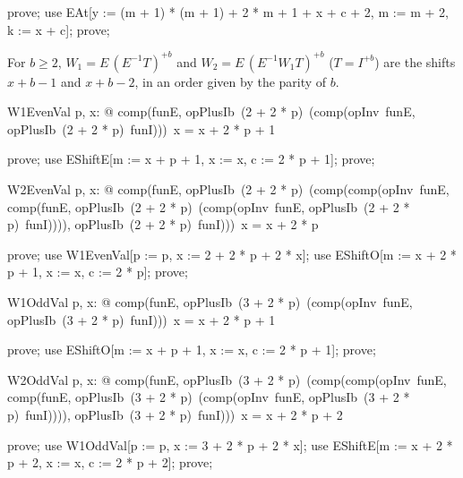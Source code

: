 \documentclass{article}
\begin{document}
\begin{zproof}
prove;
use EAt[y := (m + 1) * (m + 1) + 2 * m + 1 + x + c + 2, m := m + 2, k := x + c];
prove;
\end{zproof}

For $b \geq 2$, $W_1 = E\,(E^{-1} T)^{+b}$ and $W_2 = E\,(E^{-1} W_1 T)^{+b}$ ($T = I^{+b}$) are the
shifts $x + b - 1$ and $x + b - 2$, in an order given by the parity of $b$.

\begin{theorem}{W1EvenVal}
  \forall p, x: \nat @ comp(funE, opPlusIb~(2 + 2 * p)~(comp(opInv~funE, opPlusIb~(2 + 2 * p)~funI)))~x = x + 2 * p + 1
\end{theorem}

\begin{zproof}
prove;
use EShiftE[m := x + p + 1, x := x, c := 2 * p + 1];
prove;
\end{zproof}

\begin{theorem}{W2EvenVal}
  \forall p, x: \nat @ comp(funE, opPlusIb~(2 + 2 * p)~(comp(comp(opInv~funE, comp(funE, opPlusIb~(2 + 2 * p)~(comp(opInv~funE, opPlusIb~(2 + 2 * p)~funI)))), opPlusIb~(2 + 2 * p)~funI)))~x = x + 2 * p
\end{theorem}

\begin{zproof}
prove;
use W1EvenVal[p := p, x := 2 + 2 * p + 2 * x];
use EShiftO[m := x + 2 * p + 1, x := x, c := 2 * p];
prove;
\end{zproof}

\begin{theorem}{W1OddVal}
  \forall p, x: \nat @ comp(funE, opPlusIb~(3 + 2 * p)~(comp(opInv~funE, opPlusIb~(3 + 2 * p)~funI)))~x = x + 2 * p + 1
\end{theorem}

\begin{zproof}
prove;
use EShiftO[m := x + p + 1, x := x, c := 2 * p + 1];
prove;
\end{zproof}

\begin{theorem}{W2OddVal}
  \forall p, x: \nat @ comp(funE, opPlusIb~(3 + 2 * p)~(comp(comp(opInv~funE, comp(funE, opPlusIb~(3 + 2 * p)~(comp(opInv~funE, opPlusIb~(3 + 2 * p)~funI)))), opPlusIb~(3 + 2 * p)~funI)))~x = x + 2 * p + 2
\end{theorem}

\begin{zproof}
prove;
use W1OddVal[p := p, x := 3 + 2 * p + 2 * x];
use EShiftE[m := x + 2 * p + 2, x := x, c := 2 * p + 2];
prove;
\end{zproof}
\end{document}
